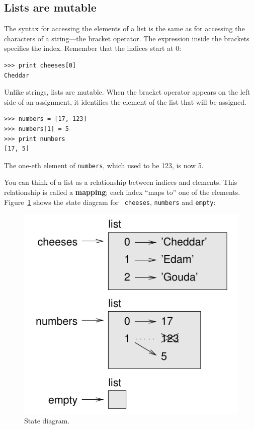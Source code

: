 \documentclass[10pt]{book}
\begin{document}
\begin{CJK}{UTF8}{gbsn}
\section{Lists are mutable}
\label{mutable}

The syntax for accessing the elements of a list is the same as for
accessing the characters of a string---the bracket operator.  The
expression inside the brackets specifies the index.  Remember that the
indices start at 0:

\begin{verbatim}
>>> print cheeses[0]
Cheddar
\end{verbatim}
%
Unlike strings, lists are mutable.  When the bracket operator appears
on the left side of an assignment, it identifies the element of the
list that will be assigned.

\begin{verbatim}
>>> numbers = [17, 123]
>>> numbers[1] = 5
>>> print numbers
[17, 5]
\end{verbatim}
%
The one-eth element of {\tt numbers}, which
used to be 123, is now 5.

You can think of a list as a relationship between indices and
elements.  This relationship is called a {\bf mapping}; each index
``maps to'' one of the elements.  Figure~\ref{fig.liststate} shows 
the state diagram for {\tt
cheeses}, {\tt numbers} and {\tt empty}:

\begin{figure}
\centerline
{\includegraphics[scale=0.8]{figs/liststate.pdf}}
\caption{State diagram.}
\label{fig.liststate}
\end{figure}


\end{CJK}
\end{document}
